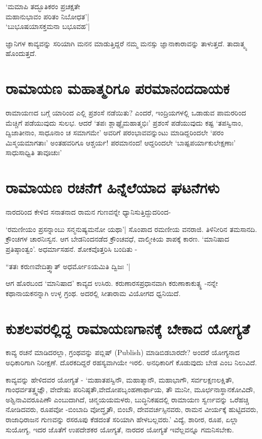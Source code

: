 \begin{shloka}
`ಮಮಾಪಿ ತದ್ಭೂತಿಕರಂ ಪ್ರಚಕ್ಷತೇ\\
ಮಹಾನುಭಾವಂ ಪರಿತಂ ನಿಬೋಧತ'|\\
`ಬುಭೂಷಯಾಸಕ್ತಮನಾ ಬಭೂವಹ'|
\end{shloka}
ಜ್ಞಾನಿಗಳ ಕಾವ್ಯವನ್ನು 
ಸರಿಯಾಗಿ ಮನನ ಮಾಡುತ್ತಿದ್ದರೆ 
ನಮ್ಮ ಮನಸ್ಸು ಜ್ಞಾನಾಕಾರಾವನ್ನು ತಾಳುತ್ತದೆ. ತಾದಾತ್ಮ್ಯ ಹೊಂದುತ್ತದೆ.

\section*{ರಾಮಾಯಣ ಮಹಾತ್ಮರಿಗೂ ಪರಮಾನಂದದಾಯಕ}

ರಾಮಾಯಣದ ಬಗ್ಗೆ ಯಾರಿಂದ 
ಎಲ್ಲಿ ಪ್ರಶಂಸೆ ನಡೆಯಿತು? 
ಎಂದರೆ, ಇಂದ್ರಿಯಗಳಲ್ಲಿ 
ಒಡಾಡುವ ಪಾಮರರಿಂದ ಮೆಚ್ಚಿಗೆ 
ಪಡೆಯುವುದು ಸುಲಭ. ಆದರೆ `ತಪಃ 
ಶ್ಲಾಘ್ಯೈಮಹಾತ್ಮಭಿಃ' 
ಪ್ರಶಂಸೆ ಪಡೆಯುವುದು ಕಷ್ಟ 
`ತಪಸ್ವಿನಾಂ, ದ್ವಿಜಾತೀನಾಂ, 
ಸಾಧೂನಾಂ ಚ ಸಮಾಗಮೇ' ಅವರಿಗೆ 
ಪರಂಭಾವವನ್ನುಂಟು 
ಮಾಡಿದ್ದರಿಂದಲೇ `ಪರಂ 
ಮಿಸ್ಮಯಮಾಗತಾಃ' ಅಂತಹವರಿಗೂ 
ಆಶ್ಚರ್ಯ! ಪರಮಾನಂದ! 
ಆದ್ದರಿಂದಲೇ `ಬಾಷ್ಪಪರ್ಯಾಕುಲೇಕ್ಷಣಾಃ' ಸಾಧುಸಾಧ್ವಿತಿ ತಾವೂಚುಃ'

\section*{ರಾಮಾಯಣ ರಚನೆಗೆ ಹಿನ್ನೆಲೆಯಾದ ಘಟನೆಗಳು}

ನಾರದರಿಂದ ಕೇಳಿದ ಸನಾತನಾದ ರಾಮನ ಗುಣವನ್ನೇ ಧ್ಯಾನಿಸುತ್ತಿದ್ದುದರಿಂದ-

`ರಮಣೀಯಂ ಪ್ರಸನ್ನಾಂಬು 
ಸನ್ಮನುಷ್ಯಮನೋ ಯಥಾ'| ಸೊಂಪಾದ 
ರಮಣೀಯ ವನರಾಜಿ. ತಿಳಿನೀರಿನ 
ತಮಸಾನದಿ. ಕ್ರೌಂಚಗಳ 
ಚಾರನಿಃಸ್ವನ. ಆಗ 
ಬೇಡನಿಂದನಡೆದ ಕ್ರೌಂಚವಧೆ, 
ವಾಲ್ಮೀಕಿಯ ಶಾಪಕ್ಕೆ ಕಾರಣ. 
`ಮಾನಿಷಾದ ಪ್ರತಿಷ್ಠಾಂತ್ವಂ'. ಅಧರ್ಮಾಸಹನೆ. ಶೋಕವೊತ್ತರಿಸಿ ಬಂದಿತು -

\begin{shloka}
``ತತಃ ಕರುಣವೇದಿತ್ತ್ವಾತ್ ಅಧರ್ಮೋಽಯಮಿತಿ ದ್ವಿಜಃ '|
\end{shloka}

ಆಗ ಹೊರಬಂದ `ಮಾನಿಷಾದ' ಕಾವ್ಯದ 
ಉಸಿರು. ಕರುಣಾರಸಪ್ರಧಾನವಾಗಿ 
ಕರುಣಾಕಾಕುತ್ಸ್ಥ  -ನನ್ನೇ 
ಕಥಾನಾಯಕನನ್ನಾಗಿ ಉಳ್ಳ ಗ್ರಂಥ. ಅದರಲ್ಲಿ ಸೀತಾರಾಮ ವಿಯೋಗದ ಧ್ವನಿಯಿದೆ.

\section*{ಕುಶಲವರಲ್ಲಿದ್ದ ರಾಮಾಯಣಗಾನಕ್ಕೆ ಬೇಕಾದ ಯೋಗ್ಯತೆ}

ಕಾವ್ಯ ರಚನೆ ಮಾಡಿದರಲ್ಲಾ, 
ಗ್ರಂಥವನ್ನು ಪಬ್ಲಿಷ್ ({\eng Publish}) 
ಮಾಡಿಬಿಡಬಾರದೇ? ಅಂದರೆ 
ಯೋಗ್ಯನಾದ ಅಧಿಕಾರಿಗಾಗಿ 
ನಿರೀಕ್ಷಣೆ. ದೊರಕದಿದ್ದರೆ 
ರಹಸ್ಯವಾಗಿಯೇ ಇರಲಿ. ಅನಧಿಕಾರಿಗೆ ಕೊಡುವುದು ಬೇಡ ಎಂಬ ನಿಲುವಿದೆ. 

ಕಾವ್ಯವನ್ನು ಹೇಳಿದವರ 
ಯೋಗ್ಯತೆ - `ಮಹಾತಪಸ್ವಿನೌ, 
ಮಹಾತ್ಮಾನೌ, ಮಹಾಭಾಗೌ, 
ಸರ್ವಲಕ್ಷಣಲಕ್ಷಿತೌ, 
ಗಾಂಧರ್ವತತ್ತ್ವಜ್ಞೌ, ವೇದೇಷು 
ಪರಿನಿಷ್ಠತೌ,ವೇದೋಪಬೃಂಹಣಾರ್ಥಾಯ, ತೌ ಮುನೀ, ಮೂರ್ಛನಾಸ್ಥಾನಕೋವಿದೌ, ಅಶ್ವಿನಾವಿವರೂಪಿಣೌ ಎಂಬುದಾಗಿದೆ, ಚಿನ್ಮಯಯಮಳರು, ಬುದ್ಧಿನಿಕಷದಲ್ಲಿ ರಾಮಾಯಣ ಸ್ವರ್ಣವನ್ನು ಒರೆಹಚ್ಚಿ ನೋಡಿದವರು, ರೂಪವೋ -ಬಿಂಬಾದಿ ವೋದ್ಧೃತೌ, ಬಿಂಬೌ, ದೇವವರ್ಚಸ್ಸಿನವರು, ರಾಮನ ವೀರ್ಯಕ್ಕೆ ಹುಟ್ಟಿದವರು, ರಾಜಾಧಿರಾಜನ ಗುಣವನ್ನು  ರಸರೂಪು ಕೆಡದಂತೆ ಸರಿಯಾಗಿ ಹೇಳಬಲ್ಲವರು.' ವಿದ್ಯೆ, ಶಾರೀರ, ರೂಪ, ಏಲ್ಲಾ ಸುಯೋಗ್ಯ, ಇದರ ಜೊತೆಗೆ ಉಪದೇಶಕರ ಯೋಗ್ಯತೆ, ನಾರದರ ಯೋಗ್ಯತೆ ಇವೆಲ್ಲವನ್ನೂ ಗಮನಿಸಬೇಕು. 

